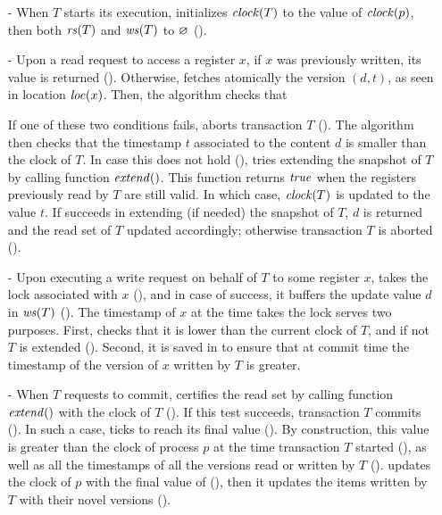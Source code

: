 \begin{itemize}
\item[-] %
  When $T$ starts its execution,  initializes
  $\clockOf{T}$ to the value of $\clockOf{p}$, then both $\readSetOf{T}$ and $\writeSetOf{T}$ to $\emptySet$ ().
\item[-] %
  Upon a read request to access a register $x$, if $x$ was previously written, its value is returned ().
  Otherwise,  fetches atomically the version $(d,t)$, as seen in location $\locationOf{x}$.
  Then, the algorithm checks that 
  If one of these two conditions fails,  aborts transaction $T$ ().
  The algorithm then checks that the timestamp $t$ associated to the content $d$ is smaller than the clock of $T$.
  In case this does not hold (),  tries extending the snapshot of $T$ by calling function $\stmExtend{}$.
  This function returns $\true$ when the registers previously read by $T$ are still valid.
  In which case, $\clockOf{T}$ is updated to the value $t$.
  If  succeeds in extending (if needed) the snapshot of $T$, $d$ is returned and the read set of $T$ updated accordingly;
  otherwise transaction $T$ is aborted ().
\item[-] %
  Upon executing a write request on behalf of $T$ to some register $x$, 
   takes the lock associated with $x$ (),
  and in case of success, it buffers the update value $d$ in $\writeSetOf{T}$ ().
  The timestamp of $x$ at the time  takes the lock serves two purposes.
  First,  checks that it is lower than the current clock of $T$, and if not $T$ is extended ().
  Second, it is saved in  to ensure that at commit time the timestamp of the version of $x$ written by $T$ is greater.
\item[-] %
  When $T$ requests to commit,  certifies the read set 
  by calling function $\stmExtend{}$ with the clock of $T$ ().
  If this test succeeds, transaction $T$ commits ().
  In such a case,  ticks to reach its final value ().
  By construction, this value is greater than the clock of process $p$ at the time transaction $T$ started (),
  as well as all the timestamps of all the versions read or written by $T$ ().
   updates the clock of $p$ with the final value of   (), 
  then it updates the items written by $T$ with their novel versions ().
\end{itemize}

